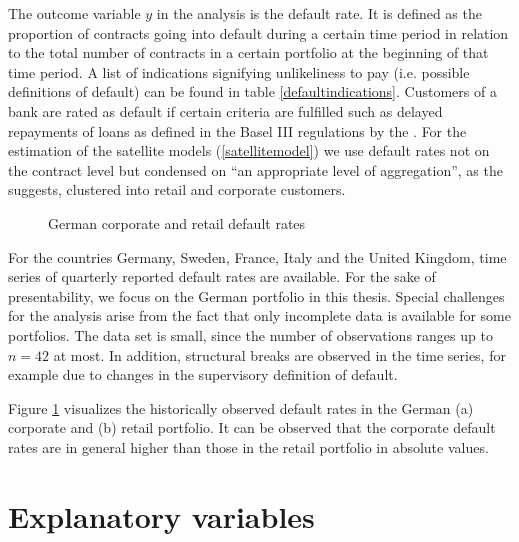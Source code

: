 \documentclass[a4paper, 11pt]{scrreprt}
\begin{document}
\clearpage






The outcome variable $y$ in the analysis is the default rate. It is defined as the proportion of contracts going into default during a certain time period in relation to the total number of contracts in a certain portfolio at the beginning of that time period.
A list of indications signifying unlikeliness to pay (i.e. possible definitions of default) can be found in table \ref{defaultindications}. Customers of a bank are rated as default if certain criteria are fulfilled such as delayed repayments of loans as defined in the Basel III regulations by the \textcite{bcbs2010baselIII}. 
For the estimation of the satellite models (\ref{satellitemodel}) we use default rates not on the contract level but condensed on ``an appropriate level of aggregation'', as the \textcite[chapter 5.5]{ecb2018srep} suggests, clustered into retail and corporate customers.

\begin{figure}[H]
	\caption{German corporate and retail default rates}
	\label{plot:germandefaultrates}
\end{figure}


For the countries Germany, Sweden, France, Italy and the United Kingdom, time series of quarterly reported default rates are available. For the sake of presentability, we focus on the German portfolio in this thesis.
Special challenges for the analysis arise from the fact that only incomplete data is available for some portfolios. The data set is small, since the number of observations ranges up to $n=42$ at most. In addition, structural breaks are observed in the time series, for example due to changes in the supervisory definition of default. 

Figure \ref{plot:germandefaultrates} visualizes the historically observed default rates in the German (a) corporate and (b) retail portfolio.
It can be observed that the corporate default rates are in general higher than those in the retail portfolio in absolute values. 

\section{Explanatory variables}
\end{document}
